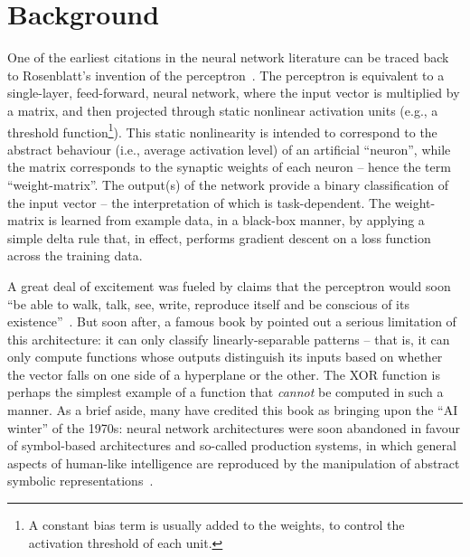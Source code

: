 \chapter{Background}
\label{chapt:background}


One of the earliest citations in the neural network literature can be traced back to Rosenblatt's invention of the perceptron~\citep{rosenblatt1958perceptron}.
The perceptron is equivalent to a single-layer, feed-forward, neural network, where the input vector is multiplied by a matrix, and then projected through static nonlinear activation units (e.g., a threshold function\footnote{A constant bias term is usually added to the weights, to control the activation threshold of each unit.}).
This static nonlinearity is intended to correspond to the abstract behaviour (i.e., average activation level) of an artificial ``neuron'', while the matrix corresponds to the synaptic weights of each neuron -- hence the term ``weight-matrix''.
The output(s) of the network provide a binary classification of the input vector -- the interpretation of which is task-dependent.
The weight-matrix is learned from example data, in a black-box manner, by applying a simple delta rule that, in effect, performs gradient descent on a loss function across the training data.

A great deal of excitement was fueled by claims that the perceptron would soon ``be able to walk, talk, see, write, reproduce itself and be conscious of its existence''~\citep{historyofperceptrons}.
But soon after, a famous book by \citet{minsky1969perceptrons} pointed out a serious limitation of this architecture: it can only classify linearly-separable patterns -- that is, it can only compute functions whose outputs distinguish its inputs based on whether the vector falls on one side of a hyperplane or the other.
The XOR function is perhaps the simplest example of a function that \emph{cannot} be computed in such a manner.
As a brief aside, many have credited this book as bringing upon the ``AI winter'' of the 1970s: neural network architectures were soon abandoned in favour of symbol-based architectures and so-called production systems, in which general aspects of human-like intelligence are reproduced by the manipulation of abstract symbolic representations~\citep{historyofperceptrons, newell1972human}.

